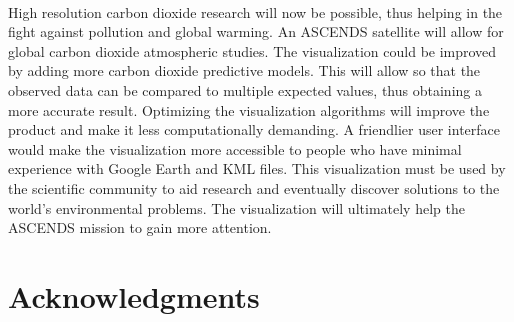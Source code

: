\documentclass[12pt,letterpaper]{report}
\begin{document}
  \paragraph{}
  High resolution carbon dioxide research will now be possible, thus helping in the fight against pollution and global warming. An ASCENDS satellite will allow for global carbon dioxide atmospheric studies. The visualization could be improved by adding more carbon dioxide predictive models. This will allow so that the observed data can be compared to multiple expected values, thus obtaining a more accurate result. Optimizing the visualization algorithms will improve the product and make it less computationally demanding. A friendlier user interface would make the visualization more accessible to people who have minimal experience with Google Earth and KML files. This visualization must be used by the scientific community to aid research and eventually discover solutions to the world's environmental problems. The visualization will ultimately help the ASCENDS mission to gain more attention.
 \section*{Acknowledgments}
\end{document}
